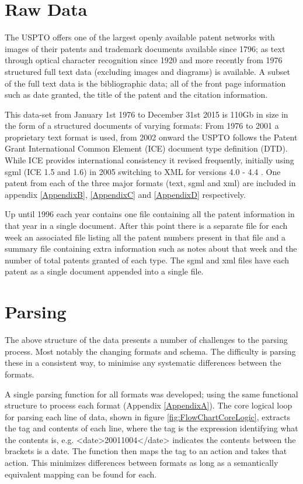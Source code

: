 \section{Raw Data} \label{section: Raw Data}

The USPTO offers one of the largest openly available patent networks with images of their patents and trademark documents available since 1796; as text through optical character recognition since 1920 and more recently from 1976 structured full text data (excluding images and diagrams) is available. A subset of the full text data is the bibliographic data; all of the front page information such as date granted, the title of the patent and the citation information. 

This data-set from January 1st 1976 to December 31st 2015 is 110Gb in size in the form of a structured documents of varying formats: From 1976 to 2001 a proprietary text format is used, from 2002 onward the USPTO follows the Patent Grant International Common Element (ICE) document type definition (DTD). While ICE provides international consistency it revised frequently, initially using sgml (ICE 1.5 and 1.6) in 2005 switching to XML for versions 4.0 - 4.4 \cite{ICE}. One patent from each of the three major formats (text, sgml and xml) are included in appendix \ref{AppendixB}, \ref{AppendixC} and \ref{AppendixD} respectively. 

Up until 1996 each year contains one file containing all the patent information in that year in a single document. After this point there is a separate file for each week an associated file listing all the patent numbers present in that file and a summary file containing extra information such as notes about that week and the number of total patents granted of each type. The sgml and xml files have each patent as a single document appended into a single file. 

\section{Parsing} \label{section:parsing}

The above structure of the data presents a number of challenges to the parsing process. Most notably the changing formats and schema. The difficulty is parsing these in a consistent way, to minimise any systematic differences between the formats.

A single parsing function for all formats was developed; using the same functional structure to process each format  (Appendix \ref{AppendixA}). The core logical loop for parsing each line of data, shown in figure \ref{fig:FlowChartCoreLogic}, extracts the tag and contents of each line, where the tag is the expression identifying what the contents is, e.g. <date>20011004</date> indicates the contents between the brackets is a date. The function then maps the tag to an action and takes that action. This minimizes differences between formats as long as a semantically equivalent mapping can be found for each. 

